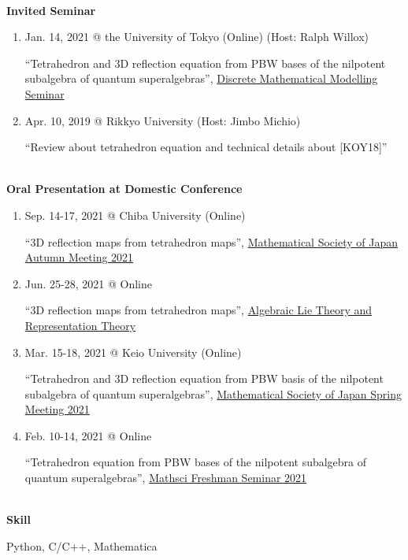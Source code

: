\documentclass[dvipdfmx]{jsarticle}
\begin{document}
%
%
%
%
{\ }\\
\vspace{3mm}
{\bf\large Invited Seminar}
\vspace{-6mm}
\\\hrulefill
\begin{enumerate}
\renewcommand*\theenumi{\the\numexpr\value{paperCounter3}-\value{enumi}}
\setcounter{paperCounter3}{3}
\item
Jan. 14, 2021 @ the University of Tokyo (Online) (Host: Ralph Willox)
\par
``Tetrahedron and 3D reflection equation from PBW bases of the nilpotent subalgebra of quantum superalgebras'', \href{https://www.ms.u-tokyo.ac.jp/seminar/discrete_e/past_e.html}{Discrete Mathematical Modelling Seminar}
%
%
\item
Apr. 10, 2019 @ Rikkyo University (Host: Jimbo Michio)
\par
``Review about tetrahedron equation and technical details about [KOY18]''
\end{enumerate}
%
%
%
%
{\ }\\
\vspace{3mm}
{\bf\large Oral Presentation at Domestic Conference}
\vspace{-6mm}
\\\hrulefill
\begin{enumerate}
\renewcommand*\theenumi{\the\numexpr\value{paperCounter4}-\value{enumi}}
\setcounter{paperCounter4}{5}
\item
Sep. 14-17, 2021 @ Chiba University (Online)
\par
``3D reflection maps from tetrahedron maps'', \href{https://www.mathsoc.jp/en/meeting/chiba21sept/}{Mathematical Society of Japan Autumn Meeting 2021}
%
%
\item
Jun. 25-28, 2021 @ Online
\par
``3D reflection maps from tetrahedron maps'', \href{https://sites.google.com/view/altret2021/\%E3\%83\%9B\%E3\%83\%BC\%E3\%83\%A0?authuser=0}{Algebraic Lie Theory and Representation Theory}
%
%
\item
Mar. 15-18, 2021 @ Keio University (Online)
\par
``Tetrahedron and 3D reflection equation from PBW basis of the nilpotent subalgebra of quantum superalgebras'', \href{https://www.mathsoc.jp/en/meeting/keio21mar/}{Mathematical Society of Japan Spring Meeting 2021}
%
%
\item
Feb. 10-14, 2021 @ Online
\par
``Tetrahedron equation from PBW bases of the nilpotent subalgebra of quantum superalgebras'', \href{https://sites.google.com/view/math-graduate/MATHSCI-FRESHMAN-SEMINAR/2021}{Mathsci Freshman Seminar 2021}
\end{enumerate}
%
%
%
%
{\ }\\
\vspace{3mm}
{\bf\large Skill}
\vspace{-6mm}
\\\hrulefill
\par
Python, C/C++, Mathematica
%
%
%
%
\end{document}
